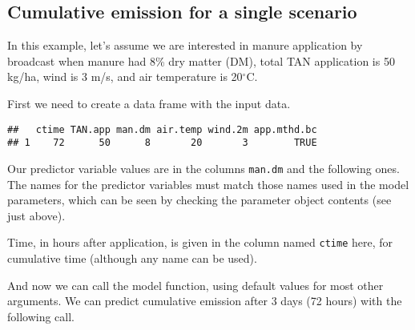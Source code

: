 \documentclass{article}
\begin{document}
\subsection{Cumulative emission for a single scenario}
In this example, let's assume we are interested in manure application by broadcast when manure had 8\% dry matter (DM), total TAN application is 50 kg/ha, wind is 3 m/s, and air temperature is 20$^\circ$C.

First we need to create a data frame with the input data.

\begin{knitrout}
\color{fgcolor}\begin{kframe}
\begin{alltt}
 \hlkwb{<-} \hlstd{(} \hlstd{=} \hlstd{,}  \hlstd{=} \hlstd{,}  \hlstd{=} \hlstd{,}
                    \hlstd{=} \hlstd{,}  \hlstd{=} \hlstd{,}
                    \hlstd{=} \hlstd{)}
\end{alltt}
\begin{verbatim}
##   ctime TAN.app man.dm air.temp wind.2m app.mthd.bc
## 1    72      50      8       20       3        TRUE
\end{verbatim}
\end{kframe}
\end{knitrout}

Our predictor variable values are in the columns \texttt{man.dm} and the following ones.
The names for the predictor variables must match those names used in the model parameters, which can be seen by checking the parameter object contents (see just above).

Time, in hours after application, is given in the column named \texttt{ctime} here, for cumulative time (although any name can be used).

And now we can call the model function, using default values for most other arguments.
We can predict cumulative emission after 3 days (72 hours) with the following call.
\end{document}
